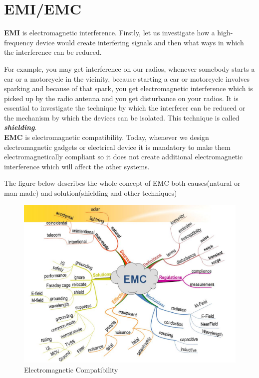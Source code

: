\section{EMI/EMC}

\textbf{EMI} is electromagnetic interference.
Firstly, let us investigate how a high-frequency device would create interfering signals and then what ways in which the interference can be reduced.

For example, you may get interference on our radios, whenever somebody starts a car or a motorcycle in the vicinity, because starting a car or motorcycle involves sparking and because of that spark, you get electromagnetic interference which is picked up by the radio antenna and you get disturbance on your radios. It is essential to investigate the technique by which the interferer can be reduced or the mechanism by which the devices can be isolated. This technique is called \textit{\textbf{shielding}}.\\

\textbf{EMC} is electromagnetic compatibility. Today, whenever we design electromagnetic gadgets or electrical device it is mandatory to make them electromagnetically compliant so it does not create additional electromagnetic interference which will affect the other systems.

The figure below describes the whole concept of EMC both causes(natural or man-made) and solution(shielding and other techniques)
\begin{figure}[h]
\centering
\includegraphics[scale=0.35]{./graphics/634771461726914062}
\caption{Electromagnetic Compatibility}
\end{figure}
